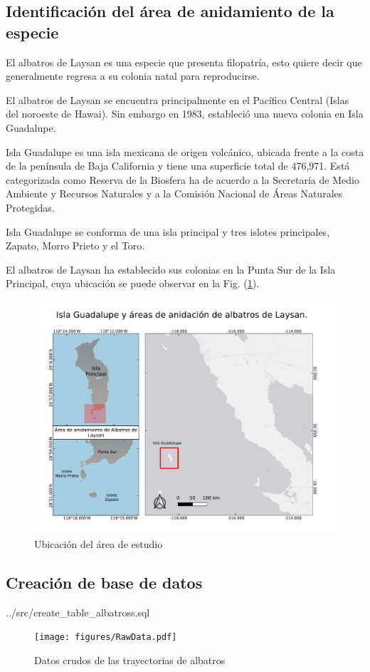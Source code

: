 \subsection{Identificación del área de anidamiento de la especie}

El albatros de Laysan es una especie que presenta filopatría, esto quiere decir
que generalmente regresa a su colonia natal para reproducirse.

El albatros de Laysan se encuentra principalmente en el Pacífico Central (Islas
del noroeste de Hawai). Sin embargo en 1983, estableció una nueva colonia en
Isla Guadalupe.

Isla Guadalupe es una isla mexicana de origen volcánico, ubicada frente a la
costa de la península de Baja California y tiene una superficie total de
476,971. Está categorizada como Reserva de la Biosfera ha de acuerdo a la
Secretaría de Medio Ambiente y Recursos Naturales y a la Comisión Nacional de
Áreas Naturales Protegidas.

Isla Guadalupe se conforma de una isla principal y tres islotes principales,
Zapato, Morro Prieto y el Toro.

El albatros de Laysan ha establecido sus colonias en la Punta Sur de la Isla
Principal, cuya ubicación se puede observar en la Fig.
(\ref{fig:ubicacionIslaGpe}).

\begin{figure}[h!]
    \includegraphics[scale=0.60]{figures/Isla Guadalupe.pdf}
    \caption{Ubicación del área de estudio}
    \label{fig:ubicacionIslaGpe}
    \centering
\end{figure}

\subsection{Creación de base de datos}

 {../src/create_table_albatross.sql}

\begin{figure}[h!]
    \texttt{[image: figures/RawData.pdf]}
    \caption{Datos crudos de las trayectorias de albatros}
    \label{fig:trayectorias}
    \centering
\end{figure}
